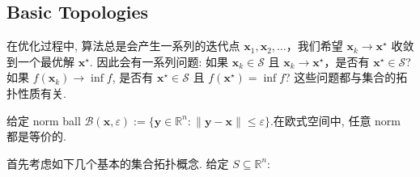 \subsection{Basic Topologies}

在优化过程中, 算法总是会产生一系列的迭代点 $\bm{x}_1, \bm{x}_2, \ldots$，我们希望 $\bm{x}_k \to \bm{x}^\star$ 收敛到一个最优解 $\bm{x}^\star$. 因此会有一系列问题: 如果 $\bm{x}_k \in \mathcal{S}$ 且 $\bm{x}_k \to \bm{x}^\star$，是否有 $\bm{x}^\star \in \mathcal{S}$? 如果 $f(\bm{x}_k) \to \inf f$, 是否有 $\bm{x}^\star \in \mathcal{S}$ 且 $f(\bm{x}^\star) = \inf f$? 这些问题都与集合的拓扑性质有关.

给定 norm ball $\mathcal{B}(\bm{x}, \varepsilon) := \{\bm{y} \in \mathbb{R}^n: \|\bm{y}-\bm{x}\| \leq \varepsilon\}$.在欧式空间中, 任意 norm 都是等价的.

首先考虑如下几个基本的集合拓扑概念. 给定 $S \subseteq \mathbb{R}^n$:

